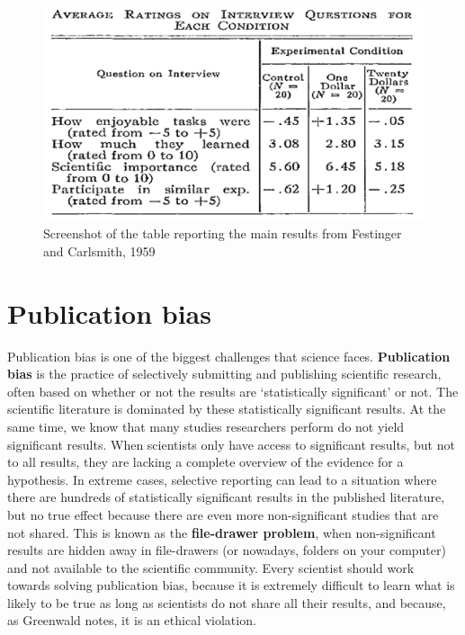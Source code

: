 \documentclass[
  oneside]{book}
\begin{document}
\begin{figure}

{\centering \includegraphics[width=1\linewidth]{images/festinger_carlsmith} 

}

\caption{Screenshot of the table reporting the main results from Festinger and Carlsmith, 1959}\label{fig:festinger}
\end{figure}

\hypertarget{publication-bias}{%
\section{Publication bias}\label{publication-bias}}

Publication bias is one of the biggest challenges that science faces. \textbf{Publication bias} is the practice of selectively submitting and publishing scientific research, often based on whether or not the results are `statistically significant' or not. The scientific literature is dominated by these statistically significant results. At the same time, we know that many studies researchers perform do not yield significant results. When scientists only have access to significant results, but not to all results, they are lacking a complete overview of the evidence for a hypothesis. In extreme cases, selective reporting can lead to a situation where there are hundreds of statistically significant results in the published literature, but no true effect because there are even more non-significant studies that are not shared. This is known as the \textbf{file-drawer problem}, when non-significant results are hidden away in file-drawers (or nowadays, folders on your computer) and not available to the scientific community. Every scientist should work towards solving publication bias, because it is extremely difficult to learn what is likely to be true as long as scientists do not share all their results, and because, as Greenwald \citeyearpar{greenwald_consequences_1975} notes, it is an ethical violation.
\end{document}
